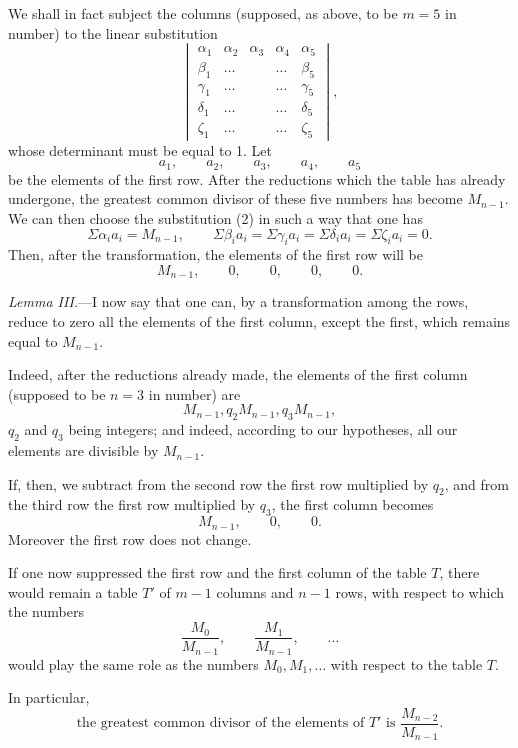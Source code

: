 \documentclass{article}
\begin{document}
We shall in fact subject the columns (supposed, as above, to be $m = 5$ in number) to the linear substitution
\[ \begin{vmatrix} \alpha_{1} & \alpha_{2} & \alpha_{3} & \alpha_{4} & \alpha_{5} \\[1ex] \beta_{1} & \ldots & & \ldots & \beta_{5} \\[1ex] \gamma_{1} & \ldots & & \ldots & \gamma_{5} \\[1ex] \delta_{1} & \ldots & & \ldots & \delta_{5} \\[1ex] \zeta_{1} & \ldots & & \ldots & \zeta_{5} \end{vmatrix}, \tag{2} \]
whose determinant must be equal to 1. Let
\[ a_{1}, \qquad a_{2}, \qquad a_{3}, \qquad a_{4}, \qquad a_{5} \]
be the elements of the first row. After the reductions which the table has already undergone, the greatest common divisor of these five numbers has become $M_{n-1}$. We can then choose the substitution (2) in such a way that one has
\[ \Sigma \alpha_{i} a_{i} = M_{n-1}, \qquad \Sigma \beta_{i} a_{i} = \Sigma \gamma_{i} a_{i} = \Sigma \delta_{i} a_{i} = \Sigma \zeta_{i} a_{i} = 0. \]
Then, after the transformation, the elements of the first row will be
\[ M_{n-1}, \qquad 0, \qquad 0, \qquad 0, \qquad 0. \]

\emph{Lemma III.}---I now say that one can, by a transformation among the rows, reduce to zero all the elements of the first column, except the first, which remains equal to $M_{n-1}$.

Indeed, after the reductions already made, the elements of the first column (supposed to be $n = 3$ in number) are
\[ M_{n-1}, q_{2} M_{n-1}, q_{3} M_{n-1}, \]
$q_{2}$ and $q_{3}$ being integers; and indeed, according to our hypotheses, all our elements are divisible by $M_{n-1}$.

If, then, we subtract from the second row the first row multiplied by $q_{2}$, and from the third row the first row multiplied by $q_{3}$, the first column becomes
\[ M_{n-1}, \qquad 0, \qquad 0. \]
Moreover the first row does not change.

If one now suppressed the first row and the first column of the table $T$, there would remain a table $T'$ of $m-1$ columns and $n-1$ rows, with respect to which the numbers
\[ \frac{M_{0}}{M_{n-1}}, \qquad \frac{M_{1}}{M_{n-1}}, \qquad \ldots \]
would play the same role as the numbers $M_{0}, M_{1}, \ldots$ with respect to the table $T$.

In particular,
\[ \text{the greatest common divisor of the elements of } T' \text{ is } \frac{M_{n-2}}{M_{n-1}}. \]
\end{document}
